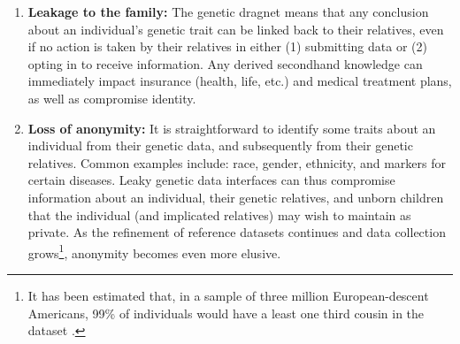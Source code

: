 \begin{enumerate}
    \item \textbf{Leakage to the family:} The genetic dragnet means that any conclusion about an individual's genetic trait can be linked back to their relatives, even if no action is taken by their relatives in either (1) submitting data or (2) opting in to receive information. Any derived secondhand knowledge can immediately impact insurance (health, life, etc.) and medical treatment plans, as well as compromise identity.

    \item \textbf{Loss of anonymity: } It is straightforward to identify some traits about an individual from their genetic data, and subsequently from their genetic relatives. Common examples include: race, gender, ethnicity, and markers for certain diseases. Leaky genetic data interfaces can thus compromise information about an individual, their genetic relatives, and unborn children that the individual (and implicated relatives) may wish to maintain as private. 
    As the refinement of reference datasets continues and data collection grows\footnote{It has been estimated that, in a sample of three million European-descent Americans, 99\% of individuals would have a least one third cousin in the dataset \cite{erlich_identity_2018}.}, anonymity becomes even more elusive.
    

\end{enumerate}
